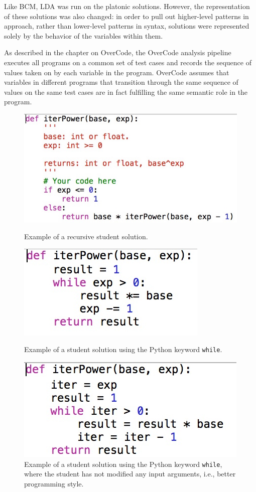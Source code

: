 Like BCM, LDA was run on the platonic solutions. However, the representation of these solutions was also changed: in order to pull out higher-level patterns in approach, rather than lower-level patterns in syntax, solutions were represented solely by the behavior of the variables within them. 

As described in the chapter on OverCode, the OverCode analysis pipeline executes all programs on a common set of test cases and records the sequence of values taken on by each variable in the program. OverCode assumes that variables in different programs that transition through the same sequence of values on the same test cases are in fact fulfilling the same semantic role in the program. %



\begin{figure}[ht]
\includegraphics[width=0.75\columnwidth]{Body/figures/grovercode/recursive_example}
\caption{Example of a recursive student solution.}
\label{recursive_example}
\vspace*{\floatsep}
\includegraphics[width=0.45\columnwidth]{Body/figures/grovercode/whilestandard}
\caption{Example of a student solution using the Python keyword \texttt{while}.}
\label{whilestandard}
\vspace*{\floatsep}
\includegraphics[width=0.5\columnwidth]{Body/figures/grovercode/augmentedwhile}
\caption{Example of a student solution using the Python keyword \texttt{while}, where the student has not modified any input arguments, i.e., better programming style.}
\label{augmentedwhile}
\end{figure} 

